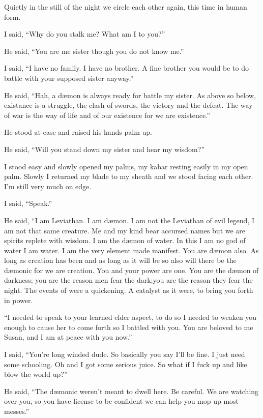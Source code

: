 \lettrine[lines=2,lraise=0]{Q}\space uietly in the still of the night we circle each other again, this time in human form.

I said, ``Why do you stalk me? What am I to you?''

He said, ``You are me sister though you do not know me.''

I said, ``I have no family. I have no brother. A fine brother you would be to do battle with your supposed sister anyway.''

He said, ``Hah, a d\ae mon is always ready for battle my sister. As above so below, existance is a struggle, the clash of swords, the victory and the defeat. The way of war is the way of life and of our existence for we are existence.''

He stood at ease and raised his hands palm up.

He said, ``Will you stand down my sister and hear my wisdom?''

I stood easy and slowly opened my palms, my kabar resting easily in my open palm. Slowly I returned my blade to my sheath and we stood facing each other. I'm still very much on edge.

I said, ``Speak.''

He said, ``I am Leviathan. I am d\ae mon. I am not the Leviathan of evil legend, I am not that same creature. Me and my kind bear accursed names but we are spirits replete with wisdom. I am the d\ae mon of water. In this I am no god of water I am water. I am the very element made manifest. You are d\ae mon also. As long as creation has been and as long as it will be so also will there be the d\ae monic for we are creation. You and your power are one. You are the d\ae mon of darkness; you are the reason men fear the dark;you are the reason they fear the night. The events of \chichenitza{} were a quickening. A catalyst as it were, to bring you forth in power.

``I needed to speak to your learned elder aspect, to do so I needed to weaken you enough to cause her to come forth so I battled with you. You are beloved to me Susan, and I am at peace with you now.''

I said, ``You're long winded dude. So basically you say I'll be fine. I just need some schooling. Oh and I got some serious juice. So what if I fuck up and like blow the world up?''

He said, ``The d\ae monic weren't meant to dwell here. Be careful. We are watching over you, so you have license to be confident we can help you mop up most messes.''

